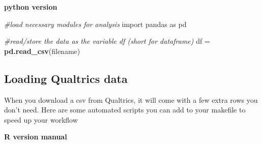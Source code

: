 \documentclass[]{book}
\newenvironment{Shaded}{\begin{snugshade}}{\end{snugshade}}
\newcommand{\KeywordTok}[1]{\textcolor[rgb]{0.13,0.29,0.53}{\textbf{#1}}}
\newcommand{\DataTypeTok}[1]{\textcolor[rgb]{0.13,0.29,0.53}{#1}}
\newcommand{\DecValTok}[1]{\textcolor[rgb]{0.00,0.00,0.81}{#1}}
\newcommand{\StringTok}[1]{\textcolor[rgb]{0.31,0.60,0.02}{#1}}
\newcommand{\CommentTok}[1]{\textcolor[rgb]{0.56,0.35,0.01}{\textit{#1}}}
\newcommand{\OperatorTok}[1]{\textcolor[rgb]{0.81,0.36,0.00}{\textbf{#1}}}
\newcommand{\NormalTok}[1]{#1}
\begin{document}
\textbf{python version}

\begin{Shaded}
\begin{Highlighting}[]
\CommentTok{#load necessary modules for analysis}
\NormalTok{import pandas as pd}

\CommentTok{#read/store the data as the variable df (short for dataframe)}
\NormalTok{df =}\StringTok{ }\KeywordTok{pd.read_csv}\NormalTok{(filename)}
\end{Highlighting}
\end{Shaded}

\subsection{Loading Qualtrics data}\label{loading-qualtrics-data}

When you download a csv from Qualtrics, it will come with a few extra
rows you don't need. Here are some automated scripts you can add to your
makefile to speed up your workflow

\textbf{R version manual}

\begin{Shaded}
\end{Shaded}
\end{document}
